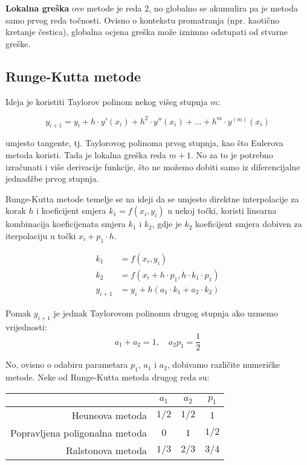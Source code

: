 \smallskip

\textbf{Lokalna greška} ove metode je reda 2, no globalno se akumulira pa je
metoda samo prvog reda točnosti. Ovisno o kontekstu promatranja (npr. kaotično
kretanje čestica), globalna ocjena greška može iznimno odstupati od stvarne
greške.

\subsection{Runge-Kutta metode}

Ideja je koristiti Taylorov polinom nekog višeg stupnja $m$:

$$
y_{i+1} = y_i + h\cdot y'(x_i) + h^2 \cdot y''(x_i) + \dots + h^m \cdot y^{(m)}(x_i)
$$

umjesto tangente, tj. Taylorovog polinoma prvog stupnja, kao što Eulerova metoda
koristi. Tada je lokalna greška reda $m + 1$. No za to je potrebno izračunati i
više derivacije funkcije, što ne možemo dobiti samo iz diferencijalne jednadžbe
prvog stupnja.

Runge-Kutta metode temelje se na ideji da se umjesto direktne interpolacije za
korak $h$ i koeficijent smjera $k_1 = f(x_i,y_i)$ u nekoj točki, koristi
linearna kombinacija koeficijenata smjera $k_1$ i $k_2$, gdje je $k_2$
koeficijent smjera dobiven za iterpolaciju u točki $x_i + p_1\cdot h$.

\begin{align*}
    k_1 &= f(x_i,y_i)\\
    k_2 &= f(x_i + h \cdot p_1,h\cdot k_1\cdot p_1)\\
    y_{i+1} &= y_i + h (a_1\cdot k_1 + a_2 \cdot k_2)
\end{align*}

Pomak $y_{i+1}$ je jednak Taylorovom polinomu drugog stupnja ako uzmemo
vrijednosti:
$$
a_1 + a_2 = 1,\quad a_2 p_1 = \frac{1}{2}
$$

No, ovisno o odabiru parametara $p_1$, $a_1$ i $a_2$, dobivamo različite
numeričke metode. Neke od Runge-Kutta metoda drugog reda su:

\begin{center}
\begin{tabular}{r|c|c|c}
    & $a_1$ & $a_2$ & $p_1$\\
    \hline
    Heuneova metoda & $1/2$ & $1/2$ & $1$\\
    \hline
    Popravljena poligonalna metoda & $0$ & $1$ & $1/2$\\
    \hline
    Ralstonova metoda & $1/3$ & $2/3$ & $3/4$\\
\end{tabular}
\end{center}

